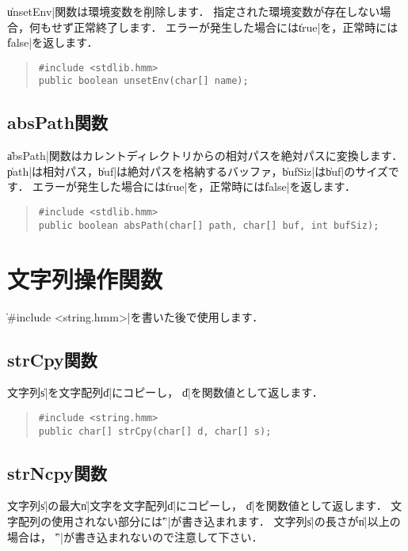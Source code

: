 \|unsetEnv|関数は環境変数を削除します．
指定された環境変数が存在しない場合，何もせず正常終了します．
エラーが発生した場合には\|true|を，正常時には\|false|を返します．

\begin{quote}
\begin{verbatim}
#include <stdlib.hmm>
public boolean unsetEnv(char[] name);
\end{verbatim}
\end{quote}

\subsection{absPath関数}

\|absPath|関数はカレントディレクトリからの相対パスを絶対パスに変換します．
\|path|は相対パス，\|buf|は絶対パスを格納するバッファ，\|bufSiz|は\|buf|のサイズです．
エラーが発生した場合には\|true|を，正常時には\|false|を返します．

\begin{quote}
\begin{verbatim}
#include <stdlib.hmm>
public boolean absPath(char[] path, char[] buf, int bufSiz);
\end{verbatim}
\end{quote}

\section{文字列操作関数}

\|#include <string.hmm>|を書いた後で使用します．

\subsection{strCpy関数}

文字列\|s|を文字配列\|d|にコピーし，
\|d|を関数値として返します．

\begin{quote}
\begin{verbatim}
#include <string.hmm>
public char[] strCpy(char[] d, char[] s);
\end{verbatim}
\end{quote}

\subsection{strNcpy関数}

文字列\|s|の最大\|n|文字を文字配列\|d|にコピーし，
\|d|を関数値として返します．
文字配列の使用されない部分には\|'\0'|が書き込まれます．
文字列\|s|の長さが\|n|以上の場合は，
\|'\0'|が書き込まれないので注意して下さい．


